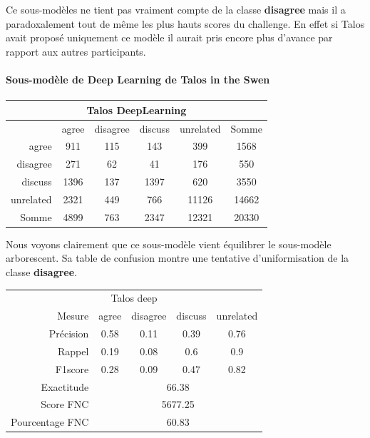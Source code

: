 \documentclass[11pt,a4paper,oldfontcommands]{memoir}
\begin{document}
Ce sous-modèles ne tient pas vraiment compte de la classe \textbf{disagree} mais il a paradoxalement tout de même les plus hauts scores du challenge. En effet si Talos avait proposé uniquement ce modèle il aurait pris encore plus  d'avance par rapport aux autres participants.
\paragraph{Sous-modèle de Deep Learning de Talos in the Swen}
\begin{center}
 \begin{tabular}{ r | c c c c | c }
  \multicolumn{6}{c}{Talos DeepLearning}                     \\
  \hline
            & agree & disagree & discuss & unrelated & Somme \\
  \hline
  agree     & 911   & 115      & 143     & 399       & 1568  \\
  disagree  & 271   & 62       & 41      & 176       & 550   \\
  discuss   & 1396  & 137      & 1397    & 620       & 3550  \\
  unrelated & 2321  & 449      & 766     & 11126     & 14662 \\
  \hline
  Somme     & 4899  & 763      & 2347    & 12321     & 20330 \\
 \end{tabular}
\end{center}



Nous voyons clairement que ce sous-modèle vient équilibrer le sous-modèle arborescent. Sa table de confusion montre une tentative d'uniformisation de la classe \textbf{disagree}.
\begin{center}
 \begin{tabular}{ r | c c c c }
  \multicolumn{5}{c}{Talos deep}                                                 \\
  Mesure          & agree                       & disagree & discuss & unrelated \\
  \hline
  Précision       & 0.58                        & 0.11     & 0.39    & 0.76      \\
  Rappel          & 0.19                        & 0.08     & 0.6     & 0.9       \\
  F1score         & 0.28                        & 0.09     & 0.47    & 0.82      \\
  \hline
  \hline
  Exactitude      & \multicolumn{4}{c}{66.38}                                    \\
  Score FNC       & \multicolumn{4}{c}{5677.25}                                  \\
  Pourcentage FNC & \multicolumn{4}{c}{60.83}                                    \\
 \end{tabular}
\end{center}
\end{document}
